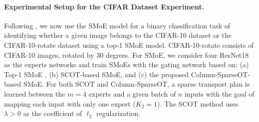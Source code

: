 \paragraph{Experimental Setup for the CIFAR Dataset Experiment.} 
Following \cite{chen2022towards}, we now use the SMoE model for a binary classification task of identifying whether a given image belongs to the CIFAR-10 dataset or the CIFAR-10-rotate dataset using a top-1 SMoE model. 
CIFAR-10-rotate consists of CIFAR-10 images, rotated by $30$ degrees. 
For SMoE, we consider four ResNet18 as the experts networks \cite{he2016residual} and train SMoEs with the gating network based on: (a) Top-1 SMoE \citep{chen2022towards}, (b) SCOT-based SMoE, and (c) the proposed Column-SparseOT-based SMoE. For both SCOT and Column-SparseOT, a sparse transport plan is learned between the $m=4$ experts and a given batch of $n$ inputs with the goal of mapping each input with only one expert ($K_2=1$). The SCOT method uses $\lambda>0$ as the coefficient of $\ell_2$ regularization.

